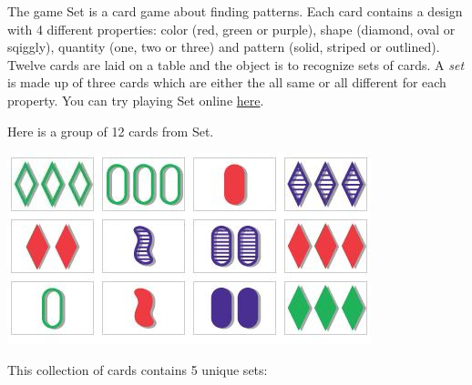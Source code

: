 \begin{problem}
The game Set is a card game about finding patterns. Each card contains a design with 4 different properties: color (red, green or purple), shape (diamond, oval or sqiggly), quantity (one, two or three) and pattern (solid, striped or outlined). Twelve cards are laid on a table and the object is to recognize sets of cards. A \emph{set} is made up of three cards which are either the all same or all different for each property. You can try playing Set online \href{http://smart-games.org/en/set/start}{here}.

Here is a group of 12 cards from Set.

\vspace{5mm} 

\includegraphics{figures/set_game.jpg}

\vspace{5mm} 

This collection of cards contains 5 unique sets:
\vspace{5mm}


\end{problem}
